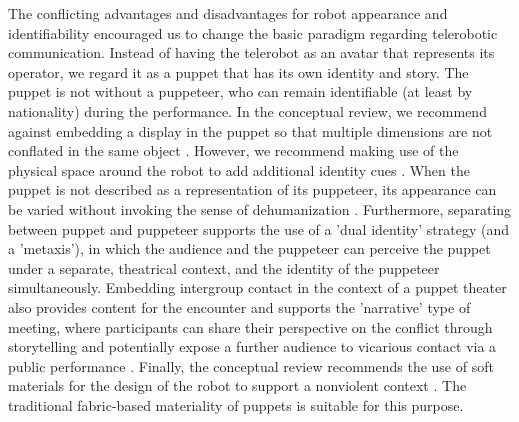 \documentclass[dissertation,math,vertlayout,pdfa,colorlinks,nologo]{aaltoseries}
\begin{document}
The conflicting advantages and disadvantages for robot appearance and identifiability encouraged us to change the basic paradigm regarding telerobotic communication. Instead of having the telerobot as an avatar that represents its operator, we regard it as a puppet that has its own identity and story. The puppet is not without a puppeteer, who can remain identifiable (at least by nationality) during the performance. In the conceptual review, we recommend against embedding a display in the puppet so that multiple dimensions are not conflated in the same object \cite[p. 81]{peledTelerobotContactHypothesis2022}. However, we recommend making use of the physical space around the robot to add additional identity cues \cite[p. 79]{peledTelerobotContactHypothesis2022}. When the puppet is not described as a representation of its puppeteer, its appearance can be varied without invoking the sense of dehumanization \cite[p. 88]{peledTelerobotContactHypothesis2022}. Furthermore, separating between puppet and puppeteer supports the use of a 'dual identity' strategy (and a 'metaxis'), in which the audience and the puppeteer can perceive the puppet under a separate, theatrical context, and the identity of the puppeteer simultaneously. Embedding intergroup contact in the context of a puppet theater also provides content for the encounter and supports the 'narrative' type of meeting, where participants can share their perspective on the conflict through storytelling and potentially expose a further audience to vicarious contact via a public performance \cite[p. 88]{peledTelerobotContactHypothesis2022}. Finally, the conceptual review recommends the use of soft materials for the design of the robot to support a nonviolent context \cite[p. 83]{peledTelerobotContactHypothesis2022}. The traditional fabric-based materiality of puppets is suitable for this purpose.
\end{document}

